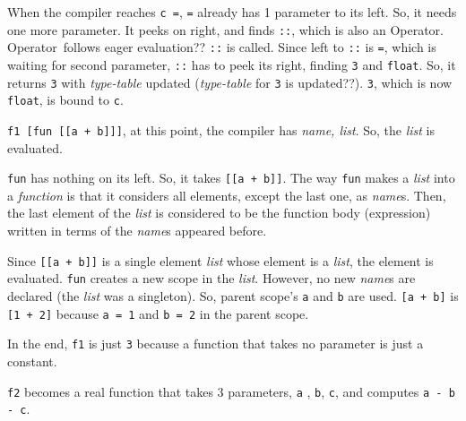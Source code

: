 \documentclass[12pt,letterpaper,notitlepage]{article}
\newcommand{\op}{Operator}
\begin{document}
When the compiler reaches \verb!c =!, \verb!=! already has 1 parameter
to its left. So, it needs one more parameter.
It peeks on right, and finds \verb!::!, which is also an \op .
\op\ follows eager evaluation??
\verb!::! is called. Since left to \verb!::! is \verb!=!, which is
waiting for second parameter, \verb!::! has to peek its right, finding
\verb!3! and \verb!float!. So, it returns \verb!3! with \emph{type-table}
updated (\emph{type-table} for \verb!3! is updated??).
\verb!3!, which is now \verb!float!, is bound to \verb!c!.

\verb!f1 [fun [[a + b]]]!, at this point, the compiler has
\emph{name, list}. So, the \emph{list} is evaluated.

\verb!fun! has nothing on its left. So, it takes \verb![[a + b]]!.
The way \verb!fun! makes a \emph{list} into a \emph{function} is that
it considers all elements, except the last one, as \emph{name}s.
Then, the last element of the \emph{list} is considered to be
the function body (expression) written in terms of the \emph{name}s
appeared before.

Since \verb![[a + b]]! is a single element \emph{list} whose
element is a \emph{list}, the element is evaluated.
\verb!fun! creates a new scope in the \emph{list}.
However, no new \emph{name}s are declared (the \emph{list} was a singleton).
So, parent scope's \verb!a! and \verb!b! are used.
\verb![a + b]! is \verb![1 + 2]! because \verb!a = 1! and \verb!b = 2!
in the parent scope.

In the end, \verb!f1! is just \verb!3! because a function that takes
no parameter is just a constant.

\verb!f2! becomes a real function that takes 3 parameters, \verb!a!
, \verb!b!, \verb!c!,  and computes \verb!a - b - c!.
\end{document}
